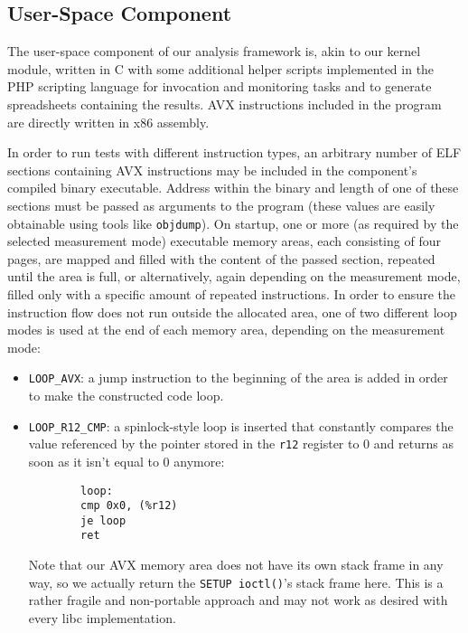 \subsection{User-Space Component}
\label{sec:analysis:design:userspace}

The user-space component of our analysis framework is, akin to our kernel module, written in C with some additional helper scripts implemented in the PHP scripting language for invocation and monitoring tasks and to generate spreadsheets containing the results. \gls{AVX} instructions included in the program are directly written in x86 assembly.

In order to run tests with different instruction types, an arbitrary number of \gls{ELF} sections containing \gls{AVX} instructions may be included in the component's compiled binary executable. Address within the binary and length of one of these sections must be passed as arguments to the program (these values are easily obtainable using tools like \texttt{objdump}). On startup, one or more (as required by the selected measurement mode) executable memory areas, each consisting of four pages, are mapped and filled with the content of the passed section, repeated until the area is full, or alternatively, again depending on the measurement mode, filled only with a specific amount of repeated instructions. In order to ensure the instruction flow does not run outside the allocated area, one of two different loop modes is used at the end of each memory area, depending on the measurement mode:

\begin{itemize}
	\item \texttt{LOOP\_AVX}: a jump instruction to the beginning of the area is added in order to make the constructed code loop.
	\item \texttt{LOOP\_R12\_CMP}: a spinlock-style loop is inserted that constantly compares the value referenced by the pointer stored in the \texttt{r12} register to $0$ and returns as soon as it isn't equal to $0$ anymore:
		\begin{verbatim}
		loop:
		cmp 0x0, (%r12)
		je loop
		ret
		\end{verbatim}
		Note that our \gls{AVX} memory area does not have its own stack frame in any way, so we actually return the \texttt{SETUP ioctl()}'s stack frame here. This is a rather fragile and non-portable approach and may not work as desired with every \gls{libc} implementation.
\end{itemize}

